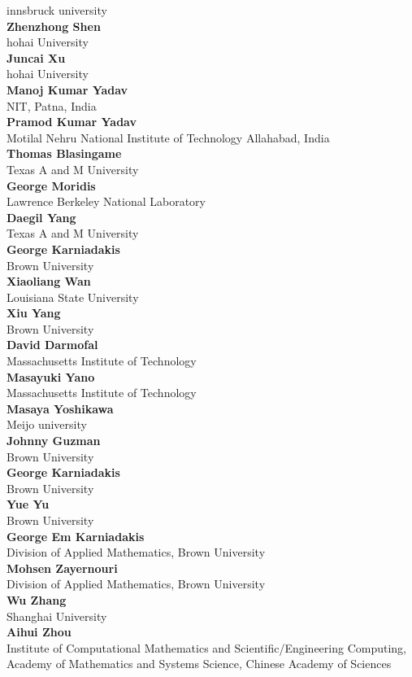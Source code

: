 \documentclass[article,A4,11pt]{llncs}%
\begin{document}
    innsbruck university\\
        \noindent
    {\bf Zhenzhong Shen}\\
    hohai University\\
        \noindent
    {\bf Juncai Xu}\\
    hohai University\\
        \noindent
    {\bf Manoj Kumar Yadav}\\
    NIT, Patna, India\\
        \noindent
    {\bf Pramod Kumar Yadav}\\
    Motilal Nehru National Institute of Technology Allahabad, India\\
        \noindent
    {\bf Thomas Blasingame}\\
    Texas A and M University\\
        \noindent
    {\bf George Moridis}\\
    Lawrence Berkeley National Laboratory\\
        \noindent
    {\bf Daegil Yang}\\
    Texas A and M University\\
        \noindent
    {\bf George Karniadakis}\\
    Brown University\\
        \noindent
    {\bf Xiaoliang Wan}\\
    Louisiana State University\\
        \noindent
    {\bf Xiu Yang}\\
    Brown University\\
        \noindent
    {\bf David Darmofal}\\
    Massachusetts Institute of Technology\\
        \noindent
    {\bf Masayuki Yano}\\
    Massachusetts Institute of Technology\\
        \noindent
    {\bf Masaya Yoshikawa}\\
    Meijo university\\
        \noindent
    {\bf Johnny Guzman}\\
    Brown University\\
        \noindent
    {\bf George Karniadakis}\\
    Brown University\\
        \noindent
    {\bf Yue Yu}\\
    Brown University\\
        \noindent
    {\bf George Em Karniadakis}\\
    Division of Applied Mathematics, Brown University\\
        \noindent
    {\bf Mohsen Zayernouri}\\
    Division of Applied Mathematics, Brown University\\
        \noindent
    {\bf Wu Zhang}\\
    Shanghai University\\
        \noindent
    {\bf Aihui Zhou}\\
    Institute of Computational Mathematics and Scientific/Engineering Computing, Academy of Mathematics and Systems Science, Chinese Academy of Sciences\\
    
\end{document}
